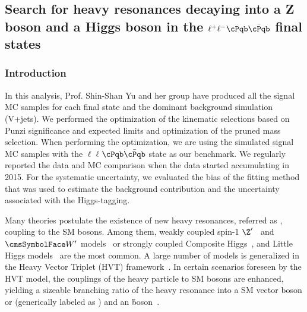 \clearpage
\newpage

\subsection{Search for heavy resonances decaying into a Z boson and a Higgs boson in the $\ell^+\ell^-\cPqb\bar{\cPqb}$ final states \label{sec:vh}}

\subsubsection*{Introduction}

In this analysis, Prof. Shin-Shan Yu and her group have produced all the signal MC samples for each final state 
and the dominant background simulation (V+jets). We performed the 
optimization of the kinematic selections based on Punzi significance and expected limits and optimization of the pruned mass 
selection. 
When performing the optimization, we are using the simulated signal MC samples with the $\ell\ell$$\cPqb\bar{\cPqb}$ state as 
our benchmark. 
We regularly reported the data and MC comparison when the data started accumulating in 2015. For the systematic uncertainty,
we evaluated the bias of the fitting method that was used to estimate the background contribution and the uncertainty associated 
with the Higgs-tagging.

Many theories postulate the existence of new heavy resonances, referred as \X, coupling to the SM bosons. Among them, weakly coupled spin-1 $\Z'$~\cite{Barger:1980ix,1126-6708-2009-11-068} and $\PW'$ models~\cite{Grojean:2011vu} or strongly coupled Composite Higgs~\cite{Contino2011,Marzocca2012,Bellazzini:2014yua}, and Little Higgs models~\cite{Han:2003wu,Schmaltz,Perelstein2007247} are the most common. A large number of models is generalized in the Heavy Vector Triplet (HVT) framework~\cite{Pappadopulo2014}.
In certain scenarios foreseen by the HVT model, the couplings of the heavy particle to SM bosons are enhanced, yielding a sizeable branching ratio of the heavy resonance into a SM vector boson \PW or \Z (generically labeled as \V) and an \h boson~\cite{Pappadopulo2014}.


